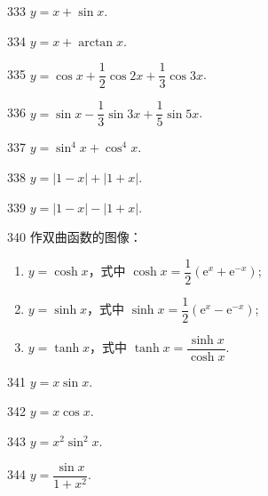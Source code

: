\begin{prob}[S]{333}
$y = x + \sin x$.
\end{prob}

\begin{prob}[S]{334}
$y = x + \arctan x$.
\end{prob}

\begin{prob}[S]{335}
$y = \cos x + \dfrac{1}{2}\cos 2x + \dfrac{1}{3}\cos 3x$.
\end{prob}

\begin{prob}[S]{336}
$y = \sin x - \dfrac{1}{3}\sin 3x + \dfrac{1}{5}\sin 5x$.
\end{prob}

\begin{prob}[S]{337}
$y = \sin^4 x + \cos^4 x$.
\end{prob}

\begin{prob}[S]{338}
$y = |1 - x| + |1 + x|$.
\end{prob}

\begin{prob}[S]{339}
$y = |1 - x| - |1 + x|$.
\end{prob}

\begin{prob}[L]{340}
作双曲函数的图像：
\begin{enumerate}[label=(\alph*), itemsep=2pt, topsep=3pt]
  \item $y = \cosh x$，式中 $\cosh x = \dfrac{1}{2}(\mathrm{e}^x + \mathrm{e}^{-x})$;
  \item $y = \sinh x$，式中 $\sinh x = \dfrac{1}{2}(\mathrm{e}^x - \mathrm{e}^{-x})$;
  \item $y = \tanh x$，式中 $\tanh x = \dfrac{\sinh x}{\cosh x}$.
\end{enumerate}
\end{prob}


\begin{prob}[S]{341}
$y = x\sin x$.
\end{prob}

\begin{prob}[S]{342}
$y = x\cos x$.
\end{prob}

\begin{prob}[S]{343}
$y = x^2 \sin^2 x$.
\end{prob}

\begin{prob}[S]{344}
$y = \dfrac{\sin x}{1 + x^2}$.
\end{prob}


